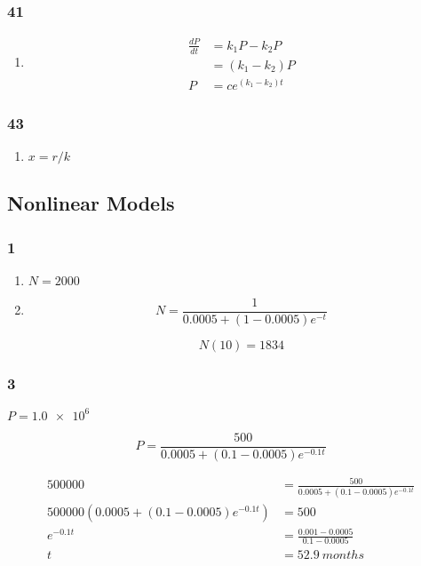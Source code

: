 \documentclass{article}
\begin{document}
\subsubsection{41}

\begin{enumerate}
  \item

        \begin{align*}
          \frac{dP}{dt} & = k_1 P - k_2 P       \\
                        & = (k_1 - k_2) P       \\
          P             & = c e^{(k_1 - k_2) t}
        \end{align*}
\end{enumerate}

\subsubsection{43}

\begin{enumerate}
  \item $x = r / k$
\end{enumerate}

\subsection{Nonlinear Models}

\subsubsection{1}

\begin{enumerate}
  \item $N = \num{2000}$

  \item

        \[N = \frac{1}{0.0005 + (1 - 0.0005) e^{-t}}\]

        \[N(10) = \num{1834}\]
\end{enumerate}

\subsubsection{3}

$P = \num{1.0e6}$

\[P = \frac{500}{0.0005 + (0.1 - 0.0005) e^{-0.1 t}}\]

\begin{align*}
  500000                                      & = \frac{500}{0.0005 + (0.1 - 0.0005) e^{-0.1 t}} \\
  500000 (0.0005 + (0.1 - 0.0005) e^{-0.1 t}) & = 500                                            \\
  e^{-0.1 t}                                  & = \frac{0.001 - 0.0005}{0.1 - 0.0005}            \\
  t                                           & = \qty{52.9}{months}
\end{align*}
\end{document}
